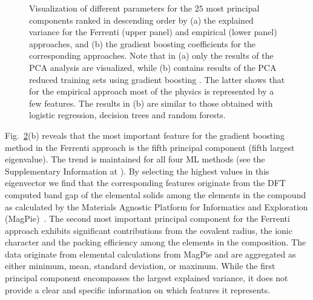 \documentclass[superscriptaddress,
preprint,
 amsmath,amssymb,
 aps,
]{revtex4-2}
\newcommand{\mrk}[1]{\textcolor{red}{#1}}
\begin{document}
\begin{figure}[t]
\begin{subfigure}[b]{0.45\textwidth}
        \label{fig:03-fi-d}
        \subcaption{}
    \end{subfigure}
    \caption{Visualization of different parameters for the $25$ most principal components ranked in descending order by (a) the explained variance for the Ferrenti (upper panel) and empirical (lower panel) approaches, and (b) the gradient boosting coefficients for the corresponding approaches. Note that in (a) only the results of the PCA analysis are visualized, while (b) contains results of the PCA reduced training sets using gradient boosting \cite{Hastie2009,xgboost2016}. The latter shows that for the empirical approach most of the physics is represented by a few features. The results in (b) are similar to those obtained with logistic regression, decision trees and random forests.  
    }
    \label{fig:PComponents}
\end{figure}

Fig.~\ref{fig:PComponents}(b) reveals that the most important feature for the gradient boosting method in the Ferrenti approach is the fifth principal component (fifth largest eigenvalue). The trend is maintained for all four ML methods (see the Supplementary Information at \cite{supplementary}). By selecting the highest values in this eigenvector we find that the corresponding features originate from the DFT computed band gap of the elemental solids among the elements in the compound as calculated by the Materials Agnostic Platform for Informatics and Exploration (MagPie)~\cite{magpie}. 
The second most important principal component for the Ferrenti approach exhibits significant contributions from the covalent radius, the ionic character and the packing efficiency among the elements in the composition. 
The data originate from elemental calculations from MagPie and are aggregated as either minimum, mean, standard deviation, or maximum. 
While the first principal component encompasses the largest explained variance, it does not provide a clear and specific information on which features it represents. 

\end{document}
